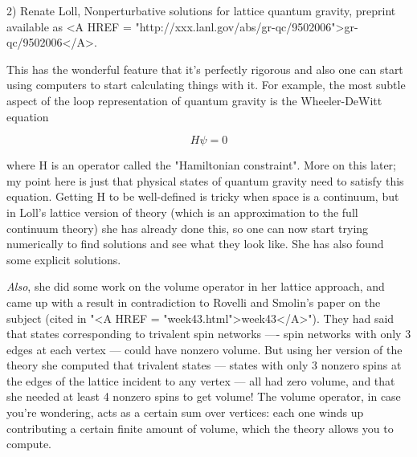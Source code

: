 2) Renate Loll, Nonperturbative solutions for lattice quantum gravity, 
preprint available as <A HREF = "http://xxx.lanl.gov/abs/gr-qc/9502006">gr-qc/9502006</A>.

This has the wonderful feature that it's perfectly rigorous and also
one can start using computers to start calculating things with it.
For example, the most subtle aspect of the loop representation of
quantum gravity is the Wheeler-DeWitt equation


$$

                                 H \psi  = 0
$$
    

where H is an operator called the "Hamiltonian constraint".  More on
this later; my point here is just that physical states of quantum
gravity need to satisfy this equation.  Getting H to be well-defined
is tricky when space is a continuum, but in Loll's lattice version of
theory (which is an approximation to the full continuum theory) she has
already done this, so one can now start trying numerically to find
solutions and see what they look like.  She has also found some explicit
solutions.  

\emph{Also}, she did some work on the volume operator in her lattice approach, 
and came up with a result in contradiction to Rovelli and Smolin's
paper on the subject (cited in "<A HREF = "week43.html">week43</A>").  They had said that states
corresponding to trivalent spin networks ---- spin networks with only
3 edges at each vertex --- could have nonzero volume.  But using her version 
of the theory she computed that trivalent states --- states with only 3 nonzero
spins at the edges of the lattice incident to any vertex --- all had
zero volume, and that she needed at least 4 nonzero spins to get
volume!  The volume operator, in case you're wondering, acts as a certain
sum over vertices: each one winds up contributing a certain finite
amount of volume, which the theory allows you to compute.

